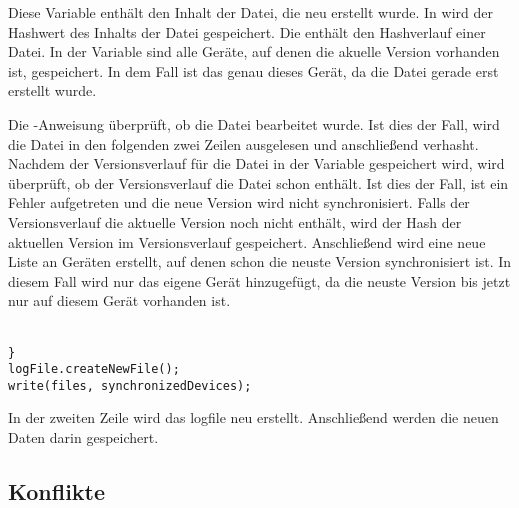 \begin{description}
	Diese Variable enthält den Inhalt der Datei, die neu erstellt wurde.
	In  wird der Hashwert des Inhalts der Datei gespeichert.
	Die  enthält den Hashverlauf einer Datei. 
	In der Variable  sind alle Geräte, auf denen die akuelle Version vorhanden ist, gespeichert. In dem Fall ist das genau dieses Gerät, da die Datei gerade erst erstellt wurde.
\end{description}
Die -Anweisung überprüft, ob die Datei bearbeitet wurde. Ist dies der Fall, wird die Datei in den folgenden zwei Zeilen ausgelesen und anschließend verhasht. Nachdem der Versionsverlauf für die Datei in der Variable  gespeichert wird, wird überprüft, ob der Versionsverlauf die Datei schon enthält. Ist dies der Fall, ist ein Fehler aufgetreten und die neue Version wird nicht synchronisiert. Falls der Versionsverlauf die aktuelle Version noch nicht enthält, wird der Hash der aktuellen Version im Versionsverlauf gespeichert. Anschließend wird eine neue Liste an Geräten erstellt, auf denen schon die neuste Version synchronisiert ist. In diesem Fall wird nur das eigene Gerät hinzugefügt, da die neuste Version bis jetzt nur auf diesem Gerät vorhanden ist. \\ \\
\javalisting
\begin{minipage}{\linewidth}
\begin{lstlisting}[caption={Schreiben des \gls{logfile}s},captionpos=b]
}
logFile.createNewFile();
write(files, synchronizedDevices);
\end{lstlisting}
\end{minipage}
In der zweiten Zeile wird das \gls{logfile} neu erstellt. Anschließend werden die neuen Daten darin gespeichert.
\subsection{Konflikte}\label{Konflikt}
